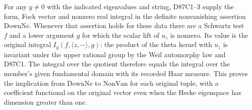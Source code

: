 For any $y\ne0$ with the indicated eigenvalues and string, D87C1--3
supply the form, Fock vector and nonzero real integral in the
definite nonvanishing assertion $\mathrm{DownNe}$. Whenever that
assertion holds for these data there are a Schwartz test $f$ and a
lower argument $g$ for which the scalar lift of $u_z$ is nonzero.
Its value is the original integral $I_y(f,\langle z,-\rangle,g)$:
the product of the theta kernel with $u_z$ is invariant under the
upper rational group by the Weil automorphy law and D87C1. The
integral over the quotient therefore equals the integral over
the member's given fundamental domain with its recorded Haar
measure. This proves the implication from $\mathrm{DownNe}$ to
$\mathrm{NonVan}$ for each original tuple, with a coefficient
functional on the original vector even when the Hecke eigenspace
has dimension greater than one.

